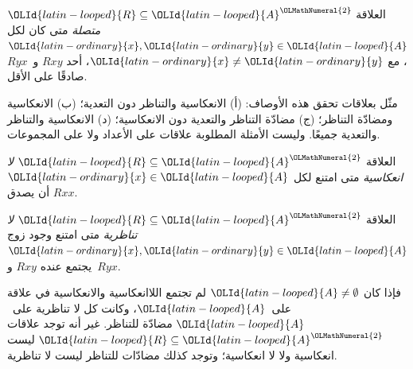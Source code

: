 \documentclass[../../../include/open-logic-section]{subfiles}
\begin{document}
\begin{defn}[الاتصالية]
العلاقة ${\OLId{latin-looped}{R}} \subseteq {\OLId{latin-looped}{A}}^{\OLMathNumeral{2}}$ \emph{متصلة} متى كان لكل ${\OLId{latin-ordinary}{x}},{\OLId{latin-ordinary}{y}}\in
{\OLId{latin-looped}{A}}$، مع ${\OLId{latin-ordinary}{x}} \neq {\OLId{latin-ordinary}{y}}$، أحد $Rxy$ و~$Ryx$ صادقًا على الأقل.
\end{defn}

\begin{prob}
مثّل بعلاقات تحقق هذه الأوصاف: (أ) الانعكاسية والتناظر دون التعدية؛
(ب) الانعكاسية ومضادّة التناظر؛ (ج) مضادّة التناظر والتعدية دون
الانعكاسية؛ (د) الانعكاسية والتناظر والتعدية جميعًا. وليست الأمثلة
المطلوبة علاقات على الأعداد ولا على المجموعات.
\end{prob}

\begin{defn}[اللاانعكاسية]
العلاقة ${\OLId{latin-looped}{R}} \subseteq {\OLId{latin-looped}{A}}^{\OLMathNumeral{2}}$ \emph{لا انعكاسية} متى امتنع لكل ${\OLId{latin-ordinary}{x}} \in
{\OLId{latin-looped}{A}}$ أن يصدق $Rxx$.
\end{defn}

\begin{defn}[اللاتناظرية]
العلاقة ${\OLId{latin-looped}{R}} \subseteq {\OLId{latin-looped}{A}}^{\OLMathNumeral{2}}$ \emph{لا تناظرية} متى امتنع وجود زوج
${\OLId{latin-ordinary}{x}},{\OLId{latin-ordinary}{y}}\in {\OLId{latin-looped}{A}}$ يجتمع عنده $Rxy$ و~$Ryx$.
\end{defn}

فإذا كان ${\OLId{latin-looped}{A}} \neq \emptyset$ لم تجتمع اللاانعكاسية والانعكاسية في
علاقة على~${\OLId{latin-looped}{A}}$، وكانت كل لا تناظرية على~${\OLId{latin-looped}{A}}$ مضادّة للتناظر.
غير أنه توجد علاقات ${\OLId{latin-looped}{R}} \subseteq {\OLId{latin-looped}{A}}^{\OLMathNumeral{2}}$ ليست انعكاسية ولا لا انعكاسية؛
وتوجد كذلك مضادّات للتناظر ليست لا تناظرية.
\end{document}
